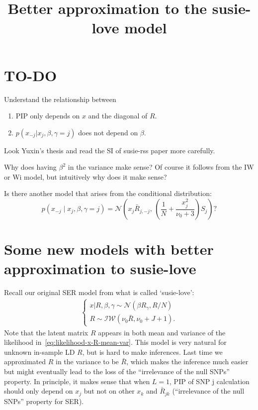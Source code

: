 \documentclass[11pt]{article}
\title{Better approximation to the susie-love model}
\author{}
\date{}
\newcommand{\Normal}{\mathcal N}
\begin{document}
\maketitle


\section{TO-DO}
Understand the relationship between 
\begin{enumerate}
\item PIP only depends on $x$ and the diagonal of $R$.
\item $p(x_{-j} | x_j, \beta, \gamma = j)$ does not depend on $\beta$.
\end{enumerate}
Look Yuxin's thesis and read the SI of susie-rss paper more carefully.

Why does having $\beta^2$ in the variance make sense? Of course it follows from the IW or Wi model, but intuitively why does it make sense?

Is there another model that arises from the conditional distribution:
\begin{equation}\label{eq:conditional-dist-Matthew}
p(x_{-j}\mid x_j, \beta, \gamma=j) = 
\Normal\left(
x_j \bar R_{j, -j} ,\,
\left(\frac{1}{N}+ \dfrac{x_j^2}{\nu_0 + 3}\right)S_j
\right)?
\end{equation}

\section{Some new models with better approximation to susie-love}
Recall our original SER model from what is called `susie-love':
\begin{align}\label{eq:likelihood-x-R-mean-var} 
\begin{cases}
x | R, \beta, \gamma \sim \mathcal{N}(\beta R_{\gamma}, R / N)\\
R \sim \mathcal{IW}(\nu_0 \bar R, \nu_0 + J + 1).
\end{cases}
\end{align}
Note that the latent matrix $R$ appears in both mean and variance of the likelihood in~\eqref{eq:likelihood-x-R-mean-var}. This model is very natural for unknown in-sample LD $R$, but is hard to make inferences. Last time we approximated $R$ in the variance to be $\bar R$, which makes the inference much easier but might eventually lead to the loss of the ``irrelevance of the null SNPs'' property. In principle, it makes sense that when $L = 1$, PIP of SNP j calculation should only depend on $x_j$ but not on other $x_k$ and $\bar R_{jk}$ (``irrelevance of the null SNPs'' property for SER).
\end{document}
